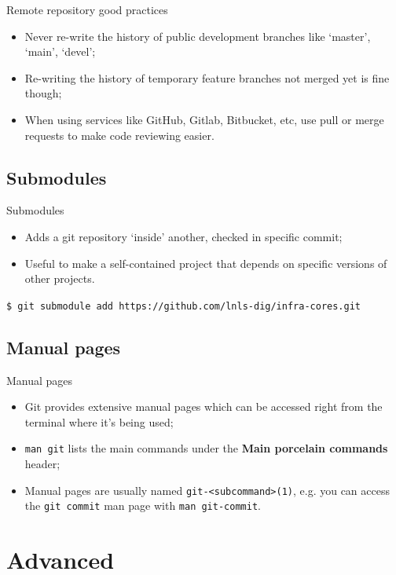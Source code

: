 \documentclass{beamer}
\begin{document}
\begin{frame}{Remote repository good practices}
  \begin{itemize}
    \item Never re-write the history of public development branches like `master', `main', `devel';
    \item Re-writing the history of temporary feature branches not merged yet is fine though;
    \item When using services like GitHub, Gitlab, Bitbucket, etc, use pull or merge requests to make code reviewing easier.
  \end{itemize}
\end{frame}

\subsection{Submodules}
\begin{frame}{Submodules}
  \begin{itemize}
    \item Adds a git repository `inside' another, checked in specific commit;
    \item Useful to make a self-contained project that depends on specific versions of other projects.
  \end{itemize}
  \begin{block}{}
    \texttt{\$ git submodule add https://github.com/lnls-dig/infra-cores.git}
  \end{block}
\end{frame}

\subsection{Manual pages}
\begin{frame}{Manual pages}
  \begin{itemize}
    \item Git provides extensive manual pages which can be accessed right from the terminal where it's being used;
    \item \texttt{man git} lists the main commands under the \textbf{Main porcelain commands} header;
    \item Manual pages are usually named \texttt{git-<subcommand>(1)}, e.g. you can access the \texttt{git commit} man page with \texttt{man git-commit}.
  \end{itemize}
\end{frame}

\section{Advanced}
\end{document}
